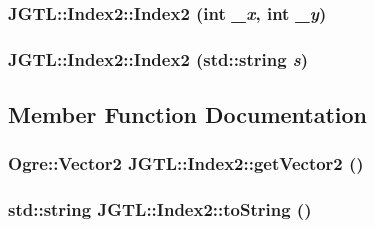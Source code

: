 \hypertarget{class_j_g_t_l_1_1_index2_7cf2a0b1b27b7f23e672dce3651977a4}{
\subsubsection[Index2]{\setlength{\rightskip}{0pt plus 5cm}JGTL::Index2::Index2 (int {\em \_\-x}, int {\em \_\-y})}}
\label{class_j_g_t_l_1_1_index2_7cf2a0b1b27b7f23e672dce3651977a4}


\hypertarget{class_j_g_t_l_1_1_index2_ba365e79cfd722dcb17518902ba3001c}{
\subsubsection[Index2]{\setlength{\rightskip}{0pt plus 5cm}JGTL::Index2::Index2 (std::string {\em s})}}
\label{class_j_g_t_l_1_1_index2_ba365e79cfd722dcb17518902ba3001c}




\subsection{Member Function Documentation}
\hypertarget{class_j_g_t_l_1_1_index2_e98b51555c8ece032c91aa828646ba15}{
\subsubsection[getVector2]{\setlength{\rightskip}{0pt plus 5cm}Ogre::Vector2 JGTL::Index2::get\-Vector2 ()}}
\label{class_j_g_t_l_1_1_index2_e98b51555c8ece032c91aa828646ba15}


\hypertarget{class_j_g_t_l_1_1_index2_be2673713b217c79db1e93287a9aa2bb}{
\subsubsection[toString]{\setlength{\rightskip}{0pt plus 5cm}std::string JGTL::Index2::to\-String ()}}
\label{class_j_g_t_l_1_1_index2_be2673713b217c79db1e93287a9aa2bb}


